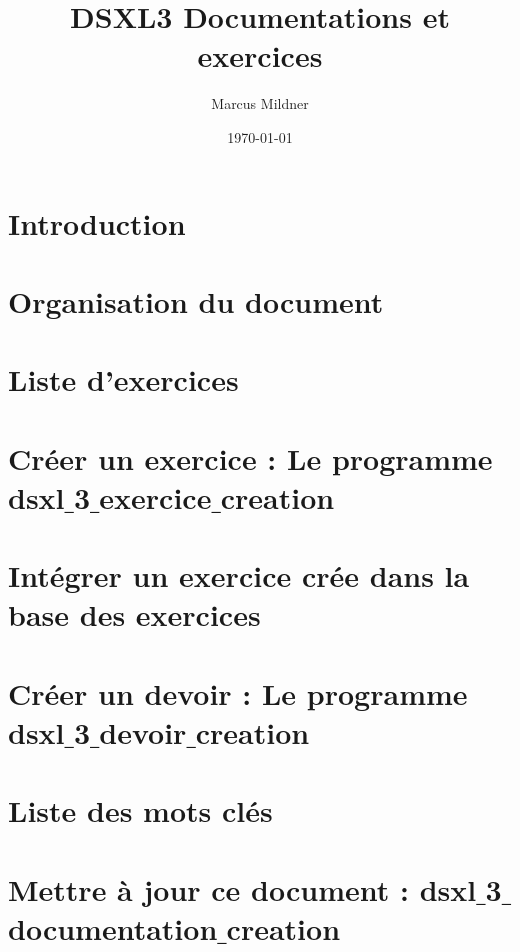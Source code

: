 \documentclass{book}
\title{DSXL3 Documentations et exercices}
\author{Marcus Mildner}
\date{\today}
\begin{document}
\maketitle
\frontmatter
\chapter{Introduction}


\newpage
\tableofcontents
\listoffigures
\listoftables
\mainmatter
\chapter{Organisation du document}



\chapter{Liste d'exercices}


\chapter{Créer un exercice : Le programme dsxl$\_$3$\_$exercice$\_$creation}


\chapter{Intégrer un exercice crée dans la base des exercices}



\chapter{Créer un devoir : Le programme dsxl$\_$3$\_$devoir$\_$creation}




\appendix
\chapter{Liste des mots clés}


\chapter{Mettre à jour ce document : dsxl$\_$3$\_$documentation$\_$creation}

\backmatter
\end{document}
